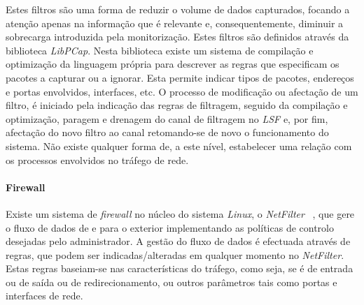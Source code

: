 \documentclass[a4paper]{llncs}
\newcommand{\td}[1]{\todo[inline]{#1}}
\begin{document}



Estes filtros são uma forma de reduzir o volume de dados capturados, focando a atenção apenas na informação que é relevante e, consequentemente, diminuir a sobrecarga introduzida pela monitorização.
 Estes filtros são definidos através da biblioteca \textit{LibPCap}.
 Nesta biblioteca existe um sistema de compilação e optimização da linguagem própria para descrever as regras que especificam os pacotes a capturar ou a ignorar.
 Esta permite indicar tipos de pacotes, endereços e portas envolvidos, interfaces, etc.
 O processo de modificação ou afectação de um filtro, é iniciado pela indicação das regras de filtragem, seguido da compilação e optimização, paragem e drenagem do canal de filtragem no \textit{LSF} e, por fim, afectação do novo filtro ao canal retomando-se de novo o funcionamento do sistema.
 Não existe qualquer forma de, a este nível, estabelecer uma relação com os processos envolvidos no tráfego de rede.


\paragraph{Firewall\\}

Existe um sistema de \textit{firewall} no núcleo do sistema \textit{Linux}, o \textit{NetFilter} ~\cite{netfiltersite}, que gere o fluxo de dados de e para o exterior implementando as políticas de controlo desejadas pelo administrador.
 A gestão do fluxo de dados é efectuada através de regras, que podem ser indicadas/alteradas em qualquer momento no \textit{NetFilter}.
 Estas regras baseiam-se nas características do tráfego, como seja, se é de entrada ou de saída ou de redirecionamento, ou outros parâmetros tais como portas e interfaces de rede.
\end{document}
